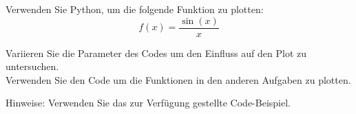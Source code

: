 \begin{ExerciseBlock}
Verwenden Sie Python, um die folgende Funktion zu plotten: 
\begin{equation*}
	f(x) = \frac{\sin(x)}{x}
\end{equation*}

Variieren Sie die Parameter des Codes um den Einfluss auf den Plot zu untersuchen. \\
Verwenden Sie den Code um die Funktionen in den anderen Aufgaben zu plotten. 

Hinweise: Verwenden Sie das zur Verfügung gestellte Code-Beispiel.
\end{ExerciseBlock}
